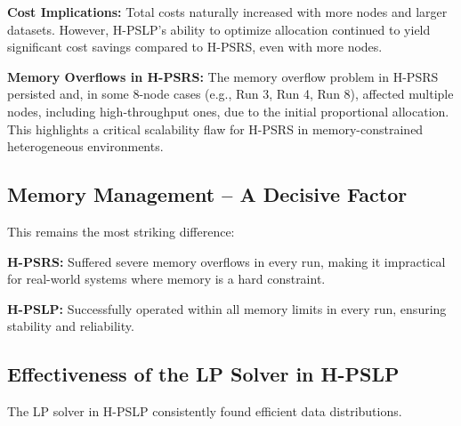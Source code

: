 \documentclass[]{interact}
\theoremstyle{plain}
\theoremstyle{definition}
\theoremstyle{remark}
\begin{document}
\textbf{Cost Implications:} Total costs naturally increased with more nodes and larger datasets. However, H-PSLP's ability to optimize allocation continued to yield significant cost savings compared to H-PSRS, even with more nodes.

\textbf{Memory Overflows in H-PSRS:} The memory overflow problem in H-PSRS persisted and, in some 8-node cases (e.g., Run 3, Run 4, Run 8), affected multiple nodes, including high-throughput ones, due to the initial proportional allocation. This highlights a critical scalability flaw for H-PSRS in memory-constrained heterogeneous environments.

\subsection{Memory Management – A Decisive Factor}

This remains the most striking difference:

\textbf{H-PSRS:} Suffered severe memory overflows in every run, making it impractical for real-world systems where memory is a hard constraint.

\textbf{H-PSLP:} Successfully operated within all memory limits in every run, ensuring stability and reliability.

\subsection{Effectiveness of the LP Solver in H-PSLP}

The LP solver in H-PSLP consistently found efficient data distributions.
\end{document}
